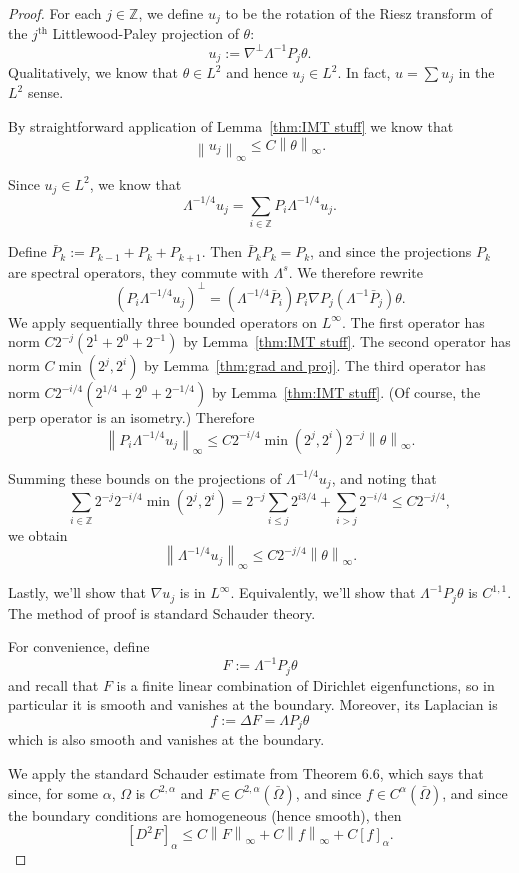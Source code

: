 \documentclass[11pt]{amsart}
\theoremstyle{remark}
\theoremstyle{definition}
\newcommand{\Z}{\mathbb{Z}}
\newcommand{\norm}[1]{\left\lVert#1\right\rVert}
\newcommand{\paren}[1]{\left( #1 \right)}
\newcommand{\bracket}[1]{\left[ #1 \right]}
\newcommand{\grad}{\nabla}
\newcommand{\Laplace}{\Delta}
\newcommand{\ith}{^\mathrm{th}}
\begin{document}
\begin{proof}
For each $j \in \Z$, we define $u_j$ to be the rotation of the Riesz transform of the $j\ith$ Littlewood-Paley projection of $\theta$:
\[ u_j := \grad^\perp \Lambda^{-1} P_j \theta. \]
Qualitatively, we know that $\theta \in L^2$ and hence $u_j \in L^2$.  In fact, $u = \sum u_j$ in the $L^2$ sense.  

By straightforward application of Lemma~\ref{thm:IMT stuff} we know that
\[ \norm{u_j}_\infty \leq C \norm{\theta}_\infty. \]

Since $u_j \in L^2$, we know that
\[ \Lambda^{-1/4} u_j = \sum_{i \in \Z} P_i \Lambda^{-1/4} u_j. \]

Define $\bar{P}_k := P_{k-1} + P_k + P_{k+1}$.  Then $\bar{P}_k P_k = P_k$, and since the projections $P_k$ are spectral operators, they commute with $\Lambda^s$.  We therefore rewrite
\[ \paren{P_i \Lambda^{-1/4} u_j}^\perp = \paren{\Lambda^{-1/4} \bar{P}_i} P_i \grad P_j \paren{\Lambda^{-1} \bar{P}_j} \theta. \]
We apply sequentially three bounded operators on $L^\infty$.  The first operator has norm $C 2^{-j}(2^{1}+2^0+2^{-1})$ by Lemma~\ref{thm:IMT stuff}.  The second operator has norm $C \min(2^j, 2^i)$ by Lemma~\ref{thm:grad and proj}.  The third operator has norm $C 2^{-i/4}(2^{1/4} + 2^0 + 2^{-1/4})$ by Lemma~\ref{thm:IMT stuff}.  (Of course, the perp operator is an isometry.)  Therefore
\[ \norm{ P_i \Lambda^{-1/4} u_j}_\infty \leq C 2^{-i/4} \min(2^j, 2^i) 2^{-j} \norm{\theta}_\infty. \]

Summing these bounds on the projections of $\Lambda^{-1/4} u_j$, and noting that
\[ \sum_{i \in \Z} 2^{-j} 2^{-i/4} \min(2^j,2^i) = 2^{-j} \sum_{i \leq j} 2^{i 3/4} + \sum_{i>j} 2^{-i/4} \leq C 2^{-j/4}, \]
we obtain
\[ \norm{\Lambda^{-1/4} u_j}_\infty \leq C 2^{-j/4} \norm{\theta}_\infty. \]

Lastly, we'll show that $\grad u_j$ is in $L^\infty$.  Equivalently, we'll show that $\Lambda^{-1} P_j \theta$ is $C^{1,1}$.  The method of proof is standard Schauder theory.  

For convenience, define 
\[ F := \Lambda^{-1} P_j \theta \]
and recall that $F$ is a finite linear combination of Dirichlet eigenfunctions, so in particular it is smooth and vanishes at the boundary.  Moreover, its Laplacian is 
\[ f := \Laplace F = \Lambda P_j \theta \]
which is also smooth and vanishes at the boundary.

We apply the standard Schauder estimate from \cite{GiTr} Theorem 6.6, which says that since, for some $\alpha$, $\Omega$ is $C^{2,\alpha}$ and $F \in C^{2,\alpha}(\bar{\Omega})$, and since $f \in C^\alpha(\bar{\Omega})$, and since the boundary conditions are homogeneous (hence smooth), then
\[ \bracket{D^2 F}_{\alpha} \leq C \norm{F}_\infty + C \norm{f}_\infty + C \bracket{f}_{\alpha}. \]


\end{proof}
\end{document}

